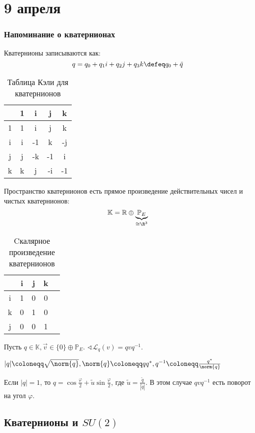 \chapter{9 апреля}

\subsection{Напоминание о кватернионах}

Кватернионы записываются как:
\[q = q_0 + q_1 i + q_2 j + q_3 k \defeq q_0 + \tilde{q}\]

\begin{table}[h]
	\centering
	\begin{tabular}{C|CCCC}
		\cdot & 1 & i  & j  & k  \\      & 1 & i  & j  & k  \\
		i     & i & -1 & k  & -j \\
		j     & j & -k & -1 & i  \\
		k     & k & j  & -i & -1
	\end{tabular}
	\caption{Таблица Кэли для кватернионов}
\end{table}

Пространство кватернионов есть прямое произведение действительных чисел и чистых кватернионов:
\[\mathbb{K} = \mathbb{R} \oplus \underbrace{\mathbb{P}_E}_{\cong \R^3}\]

\begin{table}[h]
	\centering
	\begin{tabular}{C|CCCC}
		\ev{\cdot, \cdot} & i & j & k \\ \hline
		i                 & 1 & 0 & 0 \\
		k                 & 0 & 1 & 0 \\
		j                 & 0 & 0 & 1
	\end{tabular}
	\caption{Cкалярное произведение кватернионов}
\end{table}

Пусть \(q \in \mathbb{K}, \vec{v} \in \{0\} \oplus \mathbb{P}_E\).
\(\sphericalangle \mathcal{L}_q(v) = q v q^{-1}\).

\(|q| \coloneqq \sqrt{\norm{q}}, \norm{q} \coloneqq q q^*, q^{-1} \coloneqq \frac{q^*}{\norm{q}}\)

Если \(|q| = 1\), то  \(q = \cos \frac{\varphi}{2} + \tilde{u} \sin \frac{\varphi}{2}\),
где \(\tilde{u} = \frac{\tilde{q}}{|\tilde{q}|}\).
В этом случае \(q v q^{-1}\) есть поворот на угол \(\varphi\).

\section{Кватернионы и \(SU(2)\)}

